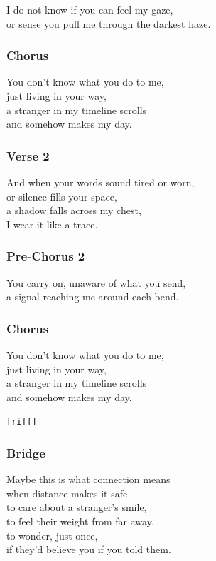 I do not know if you can feel my gaze,\\
or sense you pull me through the darkest haze.

\subsubsection{Chorus}\label{chorus-9}

You don't know what you do to me,\\
just living in your way,\\
a stranger in my timeline scrolls\\
and somehow makes my day.

\subsubsection{Verse 2}\label{verse-2-5}

And when your words sound tired or worn,\\
or silence fills your space,\\
a shadow falls across my chest,\\
I wear it like a trace.

\subsubsection{Pre-Chorus 2}\label{pre-chorus-2}

You carry on, unaware of what you send,\\
a signal reaching me around each bend.

\subsubsection{Chorus}\label{chorus-10}

You don't know what you do to me,\\
just living in your way,\\
a stranger in my timeline scrolls\\
and somehow makes my day.

\texttt{{[}riff{]}}

\subsubsection{Bridge}\label{bridge-4}

Maybe this is what connection means\\
when distance makes it safe---\\
to care about a stranger's smile,\\
to feel their weight from far away,\\
to wonder, just once,\\
if they'd believe you if you told them.

